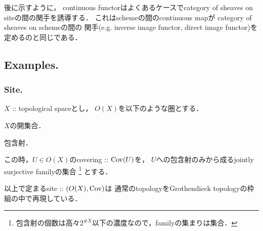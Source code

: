 \begin{Remark}
    後に示すように，
    continuous functorはよくあるケースでcategory of sheaves on siteの間の関手を誘導する．
    これはschemeの間のcontinuous mapが
    category of sheaves on schemeの間の
    関手(e.g. inverse image functor, direct image functor)を定めるのと同じである．
\end{Remark}

\subsection{Examples.}

\subsubsection{Site.}
\begin{Example}
    $X$ :: topological spaceとし，
    $O(X)$を以下のような圏とする．
    \begin{description}[labelindent=5mm]
        \item[対象] $X$の開集合．
        \item[射] 包含射．
    \end{description}
    この時，$U \in O(X)$のcovering :: $\operatorname{Cov}(U)$を，
    $U$への包含射のみから成るjointly surjective familyの集合
    \footnote{ 包含射の個数は高々$2^{\#X}$以下の濃度なので，familyの集まりは集合． }
    とする．

    以上で定まるsite :: $(O(X), \operatorname{Cov})$は
    通常のtopologyをGrothendieck topologyの枠組の中で再現している．
\end{Example}

